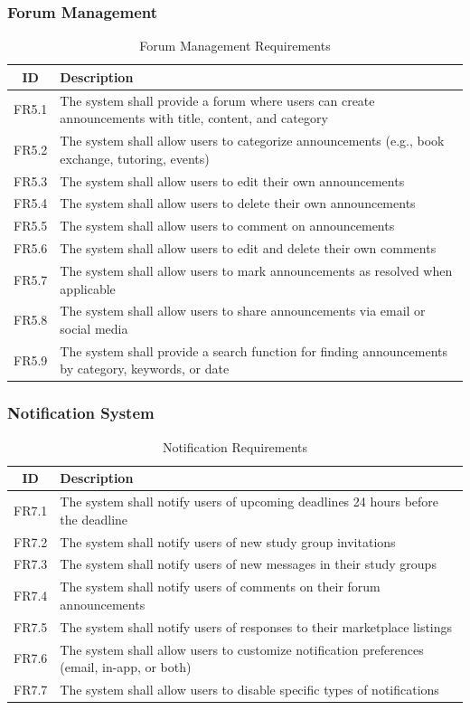 \documentclass{article}
\begin{document}
\subsubsection{Forum Management}
\begin{table}[h!]
\centering
\begin{tabular}{|c|p{10cm}|}
\hline
\textbf{ID} & \textbf{Description} \\
\hline
FR5.1 & The system shall provide a forum where users can create announcements with title, content, and category \\
FR5.2 & The system shall allow users to categorize announcements (e.g., book exchange, tutoring, events) \\
FR5.3 & The system shall allow users to edit their own announcements \\
FR5.4 & The system shall allow users to delete their own announcements \\
FR5.5 & The system shall allow users to comment on announcements \\
FR5.6 & The system shall allow users to edit and delete their own comments \\
FR5.7 & The system shall allow users to mark announcements as resolved when applicable \\
FR5.8 & The system shall allow users to share announcements via email or social media \\
FR5.9 & The system shall provide a search function for finding announcements by category, keywords, or date \\
\hline
\end{tabular}
\caption{Forum Management Requirements}
\label{tab: forum_management}
\end{table}


\subsubsection{Notification System}
\begin{table}[h!]
\centering
\begin{tabular}{|c|p{10cm}|}
\hline
\textbf{ID} & \textbf{Description} \\
\hline
FR7.1 & The system shall notify users of upcoming deadlines 24 hours before the deadline \\
FR7.2 & The system shall notify users of new study group invitations \\
FR7.3 & The system shall notify users of new messages in their study groups \\
FR7.4 & The system shall notify users of comments on their forum announcements \\
FR7.5 & The system shall notify users of responses to their marketplace listings \\
FR7.6 & The system shall allow users to customize notification preferences (email, in-app, or both) \\
FR7.7 & The system shall allow users to disable specific types of notifications \\
\hline
\end{tabular}
\caption{Notification Requirements}
\label{tab: notification_management}
\end{table}
\clearpage
\end{document}
